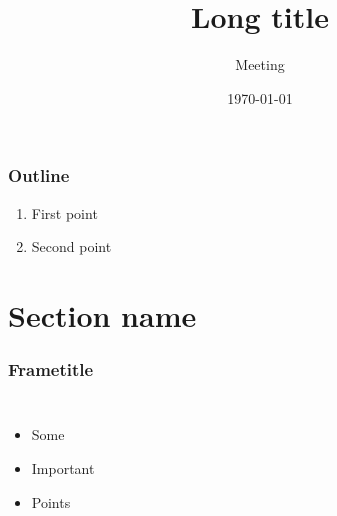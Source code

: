 
\title[Short title]{Long title}
\subtitle[ | Meeting]{Meeting}
\date{\today}

{
\begin{frame}[t,plain]
\titlepage

\end{frame}
}


\begin{frame}
\frametitle{Outline}
\begin{enumerate}
	\item First point
	\item Second point
\end{enumerate}
\end{frame}

\section{Section name}
\begin{frame}
\frametitle{Frametitle}

\begin{columns}[t]
	\begin{itemize}
		\item Some 
		\item Important
		\item Points
	\end{itemize}
\end{columns}
\end{frame}	



